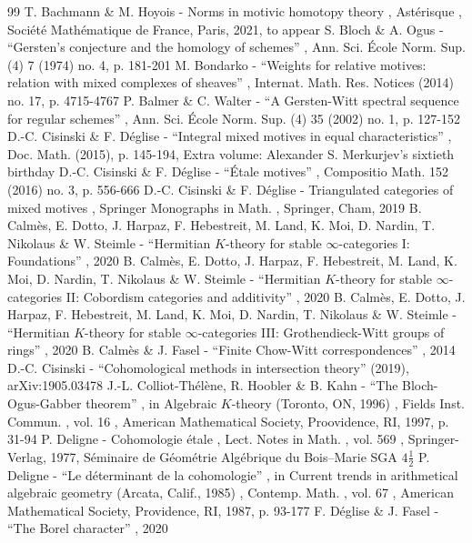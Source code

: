 \documentclass[11pt]{article}
\numberwithin{equation}{section}\renewcommand{\encodingdefault}{TU}
\begin{document}
\begin{thebibliography}{99}
 T. Bachmann \& M. Hoyois - Norms in motivic homotopy theory , Astérisque , Société Mathématique de France, Paris, 2021, to appear
 S. Bloch \& A. Ogus - “Gersten’s conjecture and the homology of schemes” , Ann. Sci. École Norm. Sup. (4) 7 (1974) no. 4, p. 181-201
 M. Bondarko - “Weights for relative motives: relation with mixed complexes of sheaves” , Internat. Math. Res. Notices (2014) no. 17, p. 4715-4767
 P. Balmer \& C. Walter - “A Gersten-Witt spectral sequence for regular schemes” , Ann. Sci. École Norm. Sup. (4) 35 (2002) no. 1, p. 127-152
 D.-C. Cisinski \& F. Déglise - “Integral mixed motives in equal characteristics” , Doc. Math. (2015), p. 145-194, Extra volume: Alexander S. Merkurjev’s sixtieth birthday
 D.-C. Cisinski \& F. Déglise - “Étale motives” , Compositio Math. 152 (2016) no. 3, p. 556-666
 D.-C. Cisinski \& F. Déglise - Triangulated categories of mixed motives , Springer Monographs in Math. , Springer, Cham, 2019
 B. Calmès, E. Dotto, J. Harpaz, F. Hebestreit, M. Land, K. Moi, D. Nardin, T. Nikolaus \& W. Steimle - “Hermitian $K$-theory for stable $\infty $-categories I: Foundations” , 2020
 B. Calmès, E. Dotto, J. Harpaz, F. Hebestreit, M. Land, K. Moi, D. Nardin, T. Nikolaus \& W. Steimle - “Hermitian $K$-theory for stable $\infty $-categories II: Cobordism categories and additivity” , 2020
 B. Calmès, E. Dotto, J. Harpaz, F. Hebestreit, M. Land, K. Moi, D. Nardin, T. Nikolaus \& W. Steimle - “Hermitian $K$-theory for stable $\infty $-categories III: Grothendieck-Witt groups of rings” , 2020
 B. Calmès \& J. Fasel - “Finite Chow-Witt correspondences” , 2014
 D.-C. Cisinski - “Cohomological methods in intersection theory” (2019), arXiv:1905.03478
 J.-L. Colliot-Thélène, R. Hoobler \& B. Kahn - “The Bloch-Ogus-Gabber theorem” , in Algebraic $K$-theory (Toronto, ON, 1996) , Fields Inst. Commun. , vol. 16 , American Mathematical Society, Proovidence, RI, 1997, p. 31-94
 P. Deligne - Cohomologie étale , Lect. Notes in Math. , vol. 569 , Springer-Verlag, 1977, Séminaire de Géométrie Algébrique du Bois–Marie SGA $4\frac{1}{2}$
 P. Deligne - “Le déterminant de la cohomologie” , in Current trends in arithmetical algebraic geometry (Arcata, Calif., 1985) , Contemp. Math. , vol. 67 , American Mathematical Society, Providence, RI, 1987, p. 93-177
 F. Déglise \& J. Fasel - “The Borel character” , 2020

\end{thebibliography}
\end{document}
